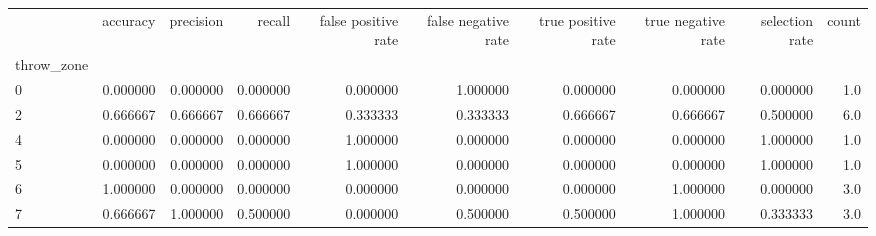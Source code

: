 \begin{tabular}{lrrrrrrrrr}
\toprule
{} &  accuracy &  precision &    recall &  false positive rate &  false negative rate &  true positive rate &  true negative rate &  selection rate &  count \\
throw\_zone &           &            &           &                      &                      &                     &                     &                 &        \\
\midrule
0          &  0.000000 &   0.000000 &  0.000000 &             0.000000 &             1.000000 &            0.000000 &            0.000000 &        0.000000 &    1.0 \\
2          &  0.666667 &   0.666667 &  0.666667 &             0.333333 &             0.333333 &            0.666667 &            0.666667 &        0.500000 &    6.0 \\
4          &  0.000000 &   0.000000 &  0.000000 &             1.000000 &             0.000000 &            0.000000 &            0.000000 &        1.000000 &    1.0 \\
5          &  0.000000 &   0.000000 &  0.000000 &             1.000000 &             0.000000 &            0.000000 &            0.000000 &        1.000000 &    1.0 \\
6          &  1.000000 &   0.000000 &  0.000000 &             0.000000 &             0.000000 &            0.000000 &            1.000000 &        0.000000 &    3.0 \\
7          &  0.666667 &   1.000000 &  0.500000 &             0.000000 &             0.500000 &            0.500000 &            1.000000 &        0.333333 &    3.0 \\
\bottomrule
\end{tabular}
